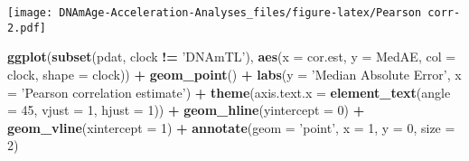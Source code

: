 \documentclass[]{article}
\newenvironment{Shaded}{\begin{snugshade}}{\end{snugshade}}
\newcommand{\KeywordTok}[1]{\textcolor[rgb]{0.13,0.29,0.53}{\textbf{#1}}}
\newcommand{\DataTypeTok}[1]{\textcolor[rgb]{0.13,0.29,0.53}{#1}}
\newcommand{\DecValTok}[1]{\textcolor[rgb]{0.00,0.00,0.81}{#1}}
\newcommand{\StringTok}[1]{\textcolor[rgb]{0.31,0.60,0.02}{#1}}
\newcommand{\CommentTok}[1]{\textcolor[rgb]{0.56,0.35,0.01}{\textit{#1}}}
\newcommand{\ControlFlowTok}[1]{\textcolor[rgb]{0.13,0.29,0.53}{\textbf{#1}}}
\newcommand{\OperatorTok}[1]{\textcolor[rgb]{0.81,0.36,0.00}{\textbf{#1}}}
\newcommand{\NormalTok}[1]{#1}
\begin{document}
\begin{Shaded}
\end{Shaded}

\texttt{[image: DNAmAge-Acceleration-Analyses\_files/figure-latex/Pearson corr-2.pdf]}

\begin{Shaded}
\begin{Highlighting}[]
\KeywordTok{ggplot}\NormalTok{(}\KeywordTok{subset}\NormalTok{(pdat, clock }\OperatorTok{!=}\StringTok{ 'DNAmTL'}\NormalTok{), }\KeywordTok{aes}\NormalTok{(}\DataTypeTok{x =}\NormalTok{ cor.est, }\DataTypeTok{y =}\NormalTok{ MedAE, }\DataTypeTok{col =}\NormalTok{ clock, }\DataTypeTok{shape =}\NormalTok{ clock)) }\OperatorTok{+}\StringTok{ }\KeywordTok{geom_point}\NormalTok{() }\OperatorTok{+}
\StringTok{  }\KeywordTok{labs}\NormalTok{(}\DataTypeTok{y =} \StringTok{'Median Absolute Error'}\NormalTok{, }\DataTypeTok{x =} \StringTok{'Pearson correlation estimate'}\NormalTok{) }\OperatorTok{+}\StringTok{ }
\StringTok{  }\KeywordTok{theme}\NormalTok{(}\DataTypeTok{axis.text.x =} \KeywordTok{element_text}\NormalTok{(}\DataTypeTok{angle =} \DecValTok{45}\NormalTok{, }\DataTypeTok{vjust =} \DecValTok{1}\NormalTok{, }\DataTypeTok{hjust =} \DecValTok{1}\NormalTok{)) }\OperatorTok{+}\StringTok{ }
\StringTok{  }\KeywordTok{geom_hline}\NormalTok{(}\DataTypeTok{yintercept =} \DecValTok{0}\NormalTok{) }\OperatorTok{+}\StringTok{ }\KeywordTok{geom_vline}\NormalTok{(}\DataTypeTok{xintercept =} \DecValTok{1}\NormalTok{) }\OperatorTok{+}\StringTok{ }
\StringTok{  }\KeywordTok{annotate}\NormalTok{(}\DataTypeTok{geom =} \StringTok{'point'}\NormalTok{, }\DataTypeTok{x =} \DecValTok{1}\NormalTok{, }\DataTypeTok{y =} \DecValTok{0}\NormalTok{, }\DataTypeTok{size =} \DecValTok{2}\NormalTok{)}
\end{Highlighting}
\end{Shaded}
\end{document}

